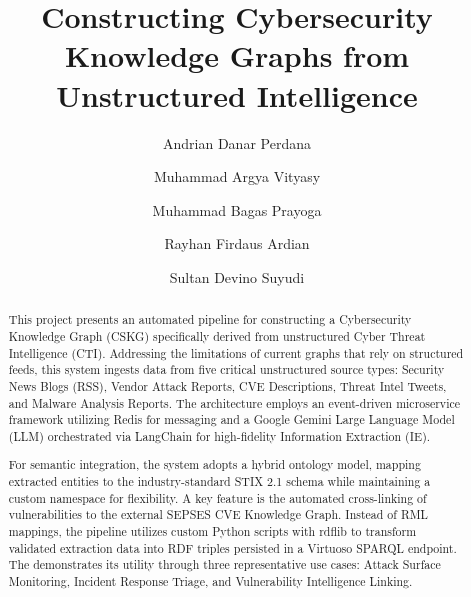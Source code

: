 \documentclass[runningheads]{llncs}
\begin{document}
\title{Constructing Cybersecurity Knowledge Graphs from Unstructured Intelligence}

\author{Andrian Danar Perdana \and
Muhammad Argya Vityasy\and
Muhammad Bagas Prayoga \and
Rayhan Firdaus Ardian \and
Sultan Devino Suyudi}


\maketitle

\begin{abstract}
This project presents an automated pipeline for constructing a Cybersecurity Knowledge Graph (CSKG) specifically derived from unstructured Cyber Threat Intelligence (CTI). Addressing the limitations of current graphs that rely on structured feeds, this system ingests data from five critical unstructured source types: Security News Blogs (RSS), Vendor Attack Reports, CVE Descriptions, Threat Intel Tweets, and Malware Analysis Reports. The architecture employs an event-driven microservice framework utilizing Redis for messaging and a Google Gemini Large Language Model (LLM) orchestrated via LangChain for high-fidelity Information Extraction (IE).



For semantic integration, the system adopts a hybrid ontology model, mapping extracted entities to the industry-standard STIX 2.1 schema while maintaining a custom namespace for flexibility. A key feature is the automated cross-linking of vulnerabilities to the external SEPSES CVE Knowledge Graph. Instead of RML mappings, the pipeline utilizes custom Python scripts with rdflib to transform validated extraction data into RDF triples persisted in a Virtuoso SPARQL endpoint. The demonstrates its utility through three representative use cases: Attack Surface Monitoring, Incident Response Triage, and Vulnerability Intelligence Linking.
\end{abstract}



















\end{document}
